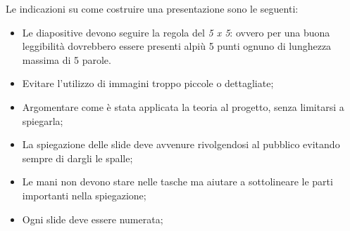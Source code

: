 \label{presentazione}
Le indicazioni su come costruire una presentazione sono le seguenti:
\begin{itemize}

\item Le diapositive devono seguire la regola del \textit{5 x 5}: ovvero per una buona leggibilit\`a dovrebbero essere presenti alpi\`u 5 punti ognuno di lunghezza massima di 5 parole.

\item Evitare l'utilizzo di immagini troppo piccole o dettagliate;

\item Argomentare come \`e stata applicata la teoria al progetto, senza limitarsi a spiegarla;

\item La spiegazione delle slide deve avvenure rivolgendosi al pubblico evitando sempre di dargli le spalle;

\item Le mani non devono stare nelle tasche ma aiutare a sottolineare le parti importanti nella spiegazione;

\item Ogni slide deve essere numerata;

\end{itemize}
